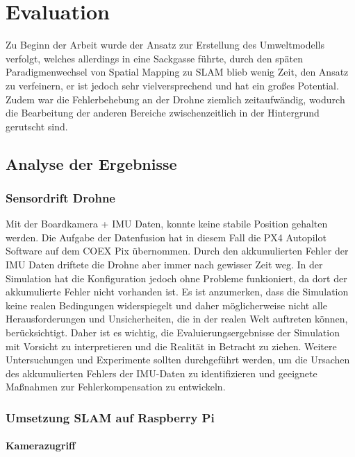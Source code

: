\chapter{Evaluation}

Zu Beginn der Arbeit wurde der Ansatz zur Erstellung des Umweltmodells verfolgt, welches allerdings in eine Sackgasse führte, durch den späten Paradigmenwechsel von Spatial Mapping zu \ac{SLAM} blieb wenig Zeit, den Ansatz zu verfeinern, er ist jedoch sehr vielversprechend und hat ein großes Potential.
Zudem war die Fehlerbehebung an der Drohne ziemlich zeitaufwändig, wodurch die Bearbeitung der anderen Bereiche zwischenzeitlich in der Hintergrund gerutscht sind.

\section{Analyse der Ergebnisse}
\subsection{Sensordrift Drohne}

Mit der Boardkamera + \ac{IMU} Daten, konnte keine stabile Position gehalten werden. Die Aufgabe der Datenfusion hat in diesem Fall die PX4 Autopilot Software auf dem COEX Pix übernommen.
Durch den akkumulierten Fehler der \ac{IMU} Daten driftete die Drohne aber immer nach gewisser Zeit weg. In der Simulation hat die Konfiguration jedoch ohne Probleme funkioniert, da dort der akkumulierte Fehler nicht vorhanden ist.
Es ist anzumerken, dass die Simulation keine realen Bedingungen widerspiegelt und daher möglicherweise nicht alle Herausforderungen und Unsicherheiten, die in der realen Welt auftreten können, berücksichtigt. Daher ist es wichtig, die Evaluierungsergebnisse der Simulation mit Vorsicht zu interpretieren und die Realität in Betracht zu ziehen. Weitere Untersuchungen und Experimente sollten durchgeführt werden, um die Ursachen des akkumulierten Fehlers der \ac{IMU}-Daten zu identifizieren und geeignete Maßnahmen zur Fehlerkompensation zu entwickeln.



\subsection{Umsetzung SLAM auf Raspberry Pi}

\subsubsection{Kamerazugriff}


